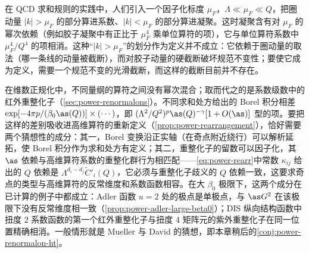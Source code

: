 \begin{remark}\label{rem:power-practical-ope}
在 QCD 求和规则的实践中\cite{ShifmanVainshteinZakharov1979a}，人们引入一个因子化标度 $\mu_F$，$\Lambda\ll\mu_F\ll Q$，把圈动量 $|k|>\mu_F$ 的部分算进系数、$|k|<\mu_F$ 的部分算进凝聚。这时凝聚含有对 $\mu_F$ 的幂次依赖（例如胶子凝聚中有正比于 $\mu_F^4$ 乘单位算符的项），它与单位算符系数中 $\mu_F^4/Q^4$ 的项相消\cite[第~2.3~节]{Beneke1999}。这种“$|k|>\mu_F$”的划分作为定义并不成立：它依赖于圈动量的取法（哪一条线的动量被截断），而对胶子动量的硬截断破坏规范不变性；要使它成为定义，需要一个规范不变的光滑截断，而这样的截断目前并不存在。

在维数正规化中，不同量纲的算符之间没有幂次混合；取而代之的是系数级数中的红外重整化子（\cref{sec:power-renormalons}）。不同求和处方给出的 Borel 积分相差 $\exp[-4\pi p/(\beta_0\as(Q))]\times(\cdots)$，即 $(\Lambda^2/Q^2)^p\as(Q)^{-\gamma}[1+O(\as)]$ 型的项。要把这样的差别吸收进高维算符的重新定义（\cref{prop:power-rearrangement}），恰好需要两个猜想性的成分：其一，Borel 变换沿正实轴（在奇点附近绕行）可以解析延拓，使 Borel 积分作为求和处方有定义；其二，重整化子的留数可以因子化，其 $\as$ 依赖与高维算符系数的重整化群行为相匹配——\eqref{eq:power-rearr}中常数 $\kappa_{ij}$ 给出的 $Q$ 依赖是 $\Lambda^{d_i-d_j}\tilde C'_i(Q)$，它必须与重整化子歧义的 $Q$ 依赖一致，这要求奇点的类型与高维算符的反常维度和系数函数相容。在大 $\beta_0$ 极限下，这两个成分在已计算的例子中都成立：Adler 函数 $u=2$ 处的极点是单极点，与 $\as G^2$ 在该极限下没有反常维度相一致（\cref{prop:power-adler-large-beta0}）；DIS 纵向结构函数中扭度 2 系数函数的第一个红外重整化子与扭度 4 矩阵元的紫外重整化子在同一位置精确相消\cite[第~4.2.2~节]{Beneke1999}。一般情形就是 Mueller 与 David 的猜想，即本章稍后的\cref{conj:power-renormalon-ht}。
\end{remark}
